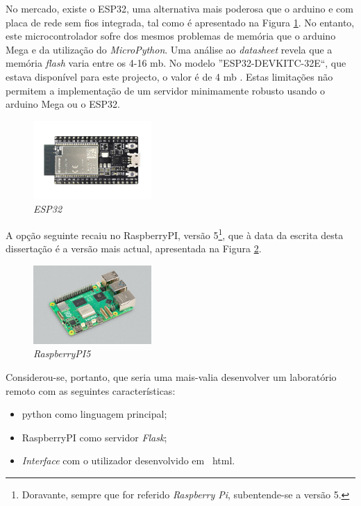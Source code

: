 No mercado, existe o \gls{ESP32}, uma alternativa mais poderosa que o \gls{arduino} e com placa de rede sem fios integrada, tal como é apresentado na Figura \ref{fig:ESP32}. No entanto, este microcontrolador sofre dos mesmos problemas de memória que o \gls{arduino} Mega e da utilização do \textit{MicroPython}. Uma análise ao \textit{datasheet} \cite{esp32datasheet} revela que a memória \textit{flash} varia entre os 4-16 \acrlong{mb}. No modelo ''ESP32-DEVKITC-32E``, que estava disponível para este projecto, o valor é de 4 \acrshort{mb} \cite{diferencaspython}. Estas limitações não permitem a implementação de um servidor minimamente robusto usando o \gls{arduino} Mega ou o \gls{ESP32}.

\begin{figure}[hbtp]
    \centering
    \includegraphics[width=0.4\textwidth]{figures/ESP32-DevKitC_L_0.png}
    \caption{\textit{ESP32} \cite{ESPDevKit}}
    \label{fig:ESP32}
\end{figure}

A opção seguinte recaiu no \gls{RaspberryPI}, versão 5\footnote{Doravante, sempre que for referido \textit{Raspberry Pi}, subentende-se a versão 5.}, que à data da escrita desta dissertação é a versão mais actual, apresentada na Figura \ref{fig:Raspberrypi5}. 

\begin{figure}[hbtp]
    \centering
    \includegraphics[width=0.4\textwidth]{figures/raspberrypi5.jpg}
    \caption{\textit{RaspberryPI5} \cite{introRaspberrypi5}}
    \label{fig:Raspberrypi5}
\end{figure}

Considerou-se, portanto, que seria uma mais-valia desenvolver um \acrshort{laboratório remoto} com as seguintes características:
\begin{itemize}
    \item \gls{python} como linguagem principal;
    \item \gls{RaspberryPI} como servidor \textit{Flask};
    \item \textit{Interface} com o utilizador desenvolvido em ~\acrfull{html}.
\end{itemize}

